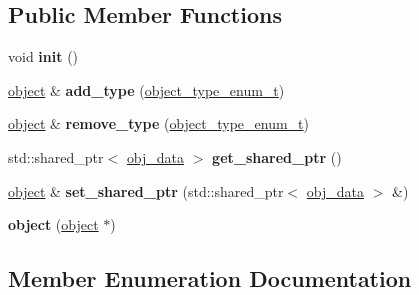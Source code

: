 \subsection*{Public Member Functions}
\begin{DoxyCompactItemize}
\item 
\mbox{\label{structmods_1_1object_aeda162dec1401bc2dd314f65a7a2d8fa}} 
void {\bfseries init} ()
\item 
\mbox{\label{structmods_1_1object_a747ae47653a9d31ef21c8c4a3a6fe3cd}} 
\hyperlink{structmods_1_1object}{object} \& {\bfseries add\+\_\+type} (\hyperlink{structmods_1_1object_a6a8f895bbe1d2306a097a2090a6caf7f}{object\+\_\+type\+\_\+enum\+\_\+t})
\item 
\mbox{\label{structmods_1_1object_a8f2dfc7a4495c98c9c858bd2d9438e88}} 
\hyperlink{structmods_1_1object}{object} \& {\bfseries remove\+\_\+type} (\hyperlink{structmods_1_1object_a6a8f895bbe1d2306a097a2090a6caf7f}{object\+\_\+type\+\_\+enum\+\_\+t})
\item 
\mbox{\label{structmods_1_1object_abdd539b8f1ac69255d97bc553ed5fd20}} 
std\+::shared\+\_\+ptr$<$ \hyperlink{structobj__data}{obj\+\_\+data} $>$ {\bfseries get\+\_\+shared\+\_\+ptr} ()
\item 
\mbox{\label{structmods_1_1object_a3a1179b8afd8f9550c700f77020f176a}} 
\hyperlink{structmods_1_1object}{object} \& {\bfseries set\+\_\+shared\+\_\+ptr} (std\+::shared\+\_\+ptr$<$ \hyperlink{structobj__data}{obj\+\_\+data} $>$ \&)
\item 
\mbox{\label{structmods_1_1object_a85f343d9f9f2e71d75d7356dd29f94d0}} 
{\bfseries object} (\hyperlink{structmods_1_1object}{object} $\ast$)
\end{DoxyCompactItemize}


\subsection{Member Enumeration Documentation}
\mbox{\label{structmods_1_1object_a6a8f895bbe1d2306a097a2090a6caf7f}} 
